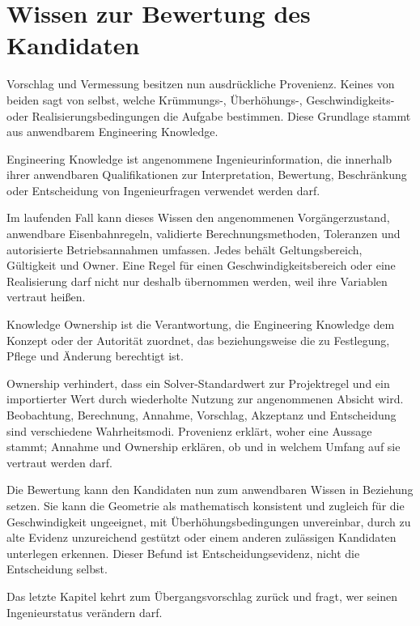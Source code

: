 
\chapter{Wissen zur Bewertung des Kandidaten}
\label{chap:engineering-knowledge}

Vorschlag und Vermessung besitzen nun ausdrückliche Provenienz. Keines von
beiden sagt von selbst, welche Krümmungs-, Überhöhungs-, Geschwindigkeits- oder
Realisierungsbedingungen die Aufgabe bestimmen. Diese Grundlage stammt aus
anwendbarem Engineering Knowledge.

\begin{definition}
\label{def:engineering-knowledge}
Engineering Knowledge ist angenommene Ingenieurinformation, die innerhalb
ihrer anwendbaren Qualifikationen zur Interpretation, Bewertung, Beschränkung
oder Entscheidung von Ingenieurfragen verwendet werden darf.
\end{definition}

Im laufenden Fall kann dieses Wissen den angenommenen Vorgängerzustand,
anwendbare Eisenbahnregeln, validierte Berechnungsmethoden, Toleranzen und
autorisierte Betriebsannahmen umfassen. Jedes behält Geltungsbereich,
Gültigkeit und Owner. Eine Regel für einen Geschwindigkeitsbereich oder eine
Realisierung darf nicht nur deshalb übernommen werden, weil ihre Variablen
vertraut heißen.

\begin{definition}
\label{def:knowledge-ownership}
Knowledge Ownership ist die Verantwortung, die Engineering Knowledge dem
Konzept oder der Autorität zuordnet, das beziehungsweise die zu Festlegung,
Pflege und Änderung berechtigt ist.
\end{definition}

Ownership verhindert, dass ein Solver-Standardwert zur Projektregel und ein
importierter Wert durch wiederholte Nutzung zur angenommenen Absicht wird.
Beobachtung, Berechnung, Annahme, Vorschlag, Akzeptanz und Entscheidung sind
verschiedene Wahrheitsmodi. Provenienz erklärt, woher eine Aussage stammt;
Annahme und Ownership erklären, ob und in welchem Umfang auf sie vertraut
werden darf.

Die Bewertung kann den Kandidaten nun zum anwendbaren Wissen in Beziehung
setzen. Sie kann die Geometrie als mathematisch konsistent und zugleich für die
Geschwindigkeit ungeeignet, mit Überhöhungsbedingungen unvereinbar, durch zu
alte Evidenz unzureichend gestützt oder einem anderen zulässigen Kandidaten
unterlegen erkennen. Dieser Befund ist Entscheidungsevidenz, nicht die
Entscheidung selbst.

Das letzte Kapitel kehrt zum Übergangsvorschlag zurück und fragt, wer seinen
Ingenieurstatus verändern darf.
